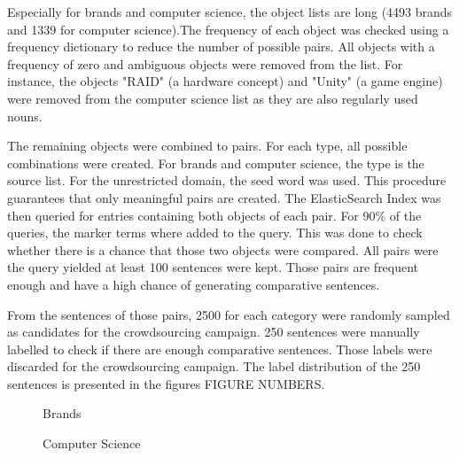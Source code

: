 Especially for brands and computer science, the object lists are long (4493 brands and 1339 for computer science).The frequency of each object was checked using a frequency dictionary to reduce the number of possible pairs. All objects with a frequency of zero and ambiguous objects were removed from the list. For instance, the objects "RAID" (a hardware concept) and "Unity" (a game engine) were removed from the computer science list as they are also regularly used nouns.

The remaining objects were combined to pairs. For each type, all possible combinations were created. For brands and computer science, the type is the source list. For the unrestricted domain, the seed word was used. This procedure guarantees that only meaningful pairs are created.
The ElasticSearch Index was then queried for entries containing both objects of each pair. For 90\% of the queries, the marker terms where added to the query. This was done to check whether there is a chance that those two objects were compared. All pairs were the query yielded at least 100 sentences were kept. Those pairs are frequent enough and have a high chance of generating comparative sentences.

From the sentences of those pairs, 2500 for each category were randomly sampled as candidates for the crowdsourcing campaign. 250 sentences were manually labelled to check if there are enough comparative sentences. Those labels were discarded for the crowdsourcing campaign.
The label distribution of the 250 sentences is presented in the figures FIGURE NUMBERS.

\begin{figure}[h]
    \centering
    \begin{minipage}{0.49\textwidth}
        \centering
               \caption{Brands}
    \end{minipage}\hfill
    \begin{minipage}{0.49\textwidth}
        \centering
        \caption{Computer Science}
    \end{minipage}
    \end{figure}
    
